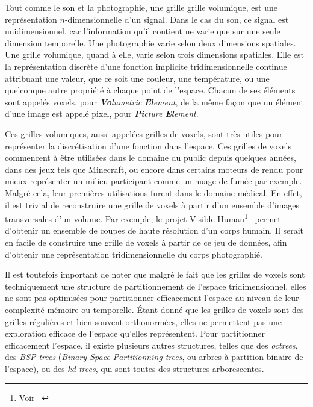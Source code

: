 {{{			Tout comme le son et la photographie, une grille grille volumique, est une représentation $n$-dimensionnelle d'un signal. Dans le cas du son, ce signal est unidimensionnel, car l'information qu'il contient ne varie que sur une seule dimension temporelle. Une photographie varie selon deux dimensions spatiales. Une grille volumique, quand à elle, varie selon trois dimensions spatiales. Elle est la représentation discrète d'une fonction implicite tridimensionnelle continue attribuant une valeur, que ce soit une couleur, une température, ou une quelconque autre propriété à chaque point de l'espace. Chacun de ses éléments sont appelés voxels, pour \textit{\textbf{Vo}}\textit{lumetric} \textit{\textbf{El}}\textit{ement}, de la même façon que un élément d'une image est appelé pixel, pour \textit{\textbf{Pi}}\textit{cture} \textbf{\textit{El}}\textit{ement}.\par

			Ces grilles volumiques, aussi appelées grilles de voxels, sont très utiles pour représenter la discrétisation d'une fonction dans l'espace. Ces grilles de voxels commencent à être utilisées dans le domaine du public depuis quelques années, dans des jeux tels que Minecraft, ou encore dans certains moteurs de rendu pour mieux représenter un milieu participant comme un nuage de fumée par exemple. Malgré cela, leur premières utilisations furent dans le domaine médical. En effet, il est trivial de reconstruire une grille de voxels à partir d'un ensemble d'images transversales d'un volume. Par exemple, le projet Visible Human\footnote{Voir ~}~\cite{cite_visible_human} permet d'obtenir un ensemble de coupes de haute résolution d'un corps humain. Il serait en facile de construire une grille de voxels à partir de ce jeu de données, afin d'obtenir une représentation tridimensionnelle du corps photographié.\par

			\par

			Il est toutefois important de noter que malgré le fait que les grilles de voxels sont techniquement une structure de partitionnement de l'espace tridimensionnel, elles ne sont pas optimisées pour partitionner efficacement l'espace au niveau de leur complexité mémoire ou temporelle. \'Etant donné que les grilles de voxels sont des grilles régulières et bien souvent orthonormées, elles ne permettent pas une exploration efficace de l'espace qu'elles représentent. Pour partitionner efficacement l'espace, il existe plusieurs autres structures, telles que des \textit{octrees}\cite{cite_octree}, des \textit{BSP trees}\cite{cite_bsp_tree} (\textit{Binary Space Partitionning trees}, ou arbres à partition binaire de l'espace), ou des \textit{kd-trees}\cite{cite_kd_tree}, qui sont toutes des structures arborescentes.
		}

}}
